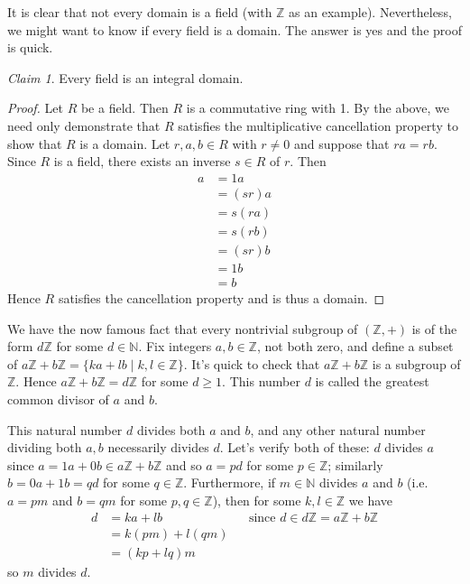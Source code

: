\documentclass[12pt,letterpaper,DIV=11,final]{scrartcl}
\theoremstyle{plain}
\theoremstyle{definition}
\theoremstyle{remark}
\newtheorem{claim}{Claim}
\begin{document}
It is clear that not every domain is a field (with $\mathbb{Z}$ as an example).
Nevertheless, we might want to know if every field is a domain.
The answer is yes and the proof is quick.

\begin{claim}
  Every field is an integral domain.

  \begin{proof}
    Let $R$ be a field.
    Then $R$ is a commutative ring with 1.
    By the above, we need only demonstrate that $R$ satisfies the multiplicative cancellation property to show that $R$ is a domain.
    Let $r, a, b \in R$ with $r \neq 0$ and suppose that $ra = rb$.
    Since $R$ is a field, there exists an inverse $s \in R$ of $r$.
    Then
    \begin{align*}
      a &= 1a \\
        &= (sr) a \\
        &= s (ra) \\
        &= s (rb) \\
        &= (sr) b \\
        &= 1b \\
        &= b
    \end{align*}
    Hence $R$ satisfies the cancellation property and is thus a domain.
  \end{proof}
\end{claim}

We have the now famous fact that every nontrivial subgroup of $(\mathbb{Z}, +)$ is of the form $d \mathbb{Z}$ for some $d \in \mathbb{N}$.
Fix integers $a, b \in \mathbb{Z}$, not both zero, and define a subset of $a \mathbb{Z} + b \mathbb{Z} = \{ ka + lb \mid k, l \in \mathbb{Z} \}$.
It's quick to check that $a \mathbb{Z} + b \mathbb{Z}$ is a subgroup of $\mathbb{Z}$.
Hence $a \mathbb{Z} + b \mathbb{Z} = d \mathbb{Z}$ for some $d \geq 1$.
This number $d$ is called the greatest common divisor of $a$ and $b$.

This natural number $d$ divides both $a$ and $b$, and any other natural number dividing both $a, b$ necessarily divides $d$.
Let's verify both of these: $d$ divides $a$ since $a = 1a + 0b \in a \mathbb{Z} + b \mathbb{Z}$ and so $a = pd$ for some $p \in \mathbb{Z}$; similarly $b = 0a + 1b = qd$ for some $q \in \mathbb{Z}$.
Furthermore, if $m \in \mathbb{N}$ divides $a$ and $b$ (i.e. $a = pm$ and $b = qm$ for some $p, q \in \mathbb{Z}$), then for some $k, l \in \mathbb{Z}$ we have
\begin{align*}
  d &= ka + lb && \text{since $d \in d \mathbb{Z} = a \mathbb{Z} + b \mathbb{Z}$} \\
    &= k (pm) + l (qm) \\
    &= (kp + lq) m
\end{align*}
so $m$ divides $d$.
\end{document}
